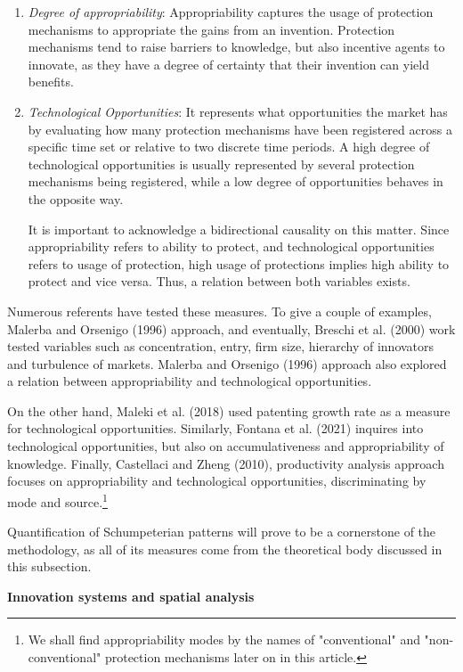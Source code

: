\documentclass[12pt,a4paper]{article}
\begin{document}
\begin{enumerate}
	\item \textit{Degree of appropriability}: Appropriability captures the usage of protection mechanisms to appropriate the gains from an invention. Protection mechanisms tend to raise barriers to knowledge, but also incentive agents to innovate, as they have a degree of certainty that their invention can yield benefits. 
	
	\item \textit{Technological Opportunities}: It represents what opportunities the market has by evaluating how many protection mechanisms have been registered across a specific time set or relative to two discrete time periods. A high degree of technological opportunities is usually represented by several protection mechanisms being registered, while a low degree of opportunities behaves in the opposite way.
	
	It is important to acknowledge a bidirectional causality on this matter. Since appropriability refers to ability to protect, and technological opportunities refers to usage of protection, high usage of protections implies high ability to protect and vice versa. Thus, a relation between both variables exists.
\end{enumerate}

Numerous referents have tested these measures. To give a couple of examples, Malerba and Orsenigo (1996) approach, and eventually, Breschi et al. (2000) work tested variables such as concentration, entry, firm size, hierarchy of innovators and turbulence of markets. Malerba and Orsenigo (1996) approach also explored a relation between appropriability and technological opportunities.

On the other hand, Maleki et al. (2018) used patenting growth rate as a measure for technological opportunities. Similarly, Fontana et al. (2021) inquires into technological opportunities, but also on accumulativeness and appropriability of knowledge. Finally, Castellaci and Zheng (2010), productivity analysis approach focuses on appropriability and technological opportunities, discriminating by mode and source.\footnote{We shall find appropriability modes by the names of "conventional" and "non-conventional" protection mechanisms later on in this article.}

Quantification of Schumpeterian patterns will prove to be a cornerstone of the methodology, as all of its measures come from the theoretical body discussed in this subsection.

\noindent \textbf{Innovation systems and spatial analysis}
\end{document}
